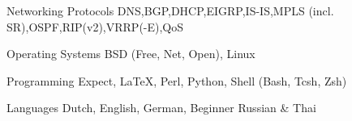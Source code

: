 

\begin{cvskills}

  \cvskill
    {Networking Protocols} %
	{DNS,BGP,DHCP,EIGRP,IS-IS,MPLS (incl. SR),OSPF,RIP(v2),VRRP(-E),QoS} %

  \cvskill
    {Operating Systems} %
	{BSD (Free, Net, Open), Linux} %

  \cvskill
    {Programming} %
	{Expect, LaTeX, Perl, Python, Shell (Bash, Tcsh, Zsh)} %

  \cvskill
    {Languages} %
	{Dutch, English, German, Beginner Russian \& Thai} %

\end{cvskills}
